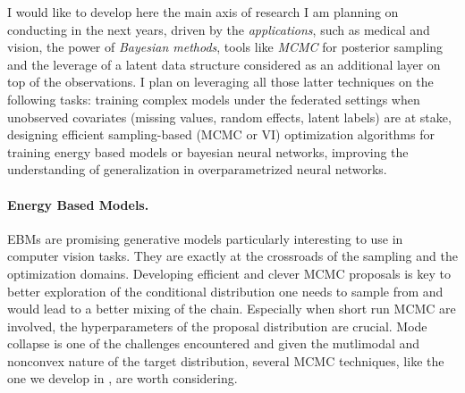 \documentclass[twoside,11pt]{article}
\begin{document}
\vspace{0.25in}
\textbf{} 
\vspace{0.15in}

I would like to develop here the main axis of research I am planning on conducting in the next years, driven by the \emph{applications}, such as medical and vision, the power of \emph{Bayesian methods}, tools like \emph{MCMC} for posterior sampling and the leverage of a latent data structure considered as an additional layer on top of the observations. 
I plan on leveraging all those latter techniques on the following tasks: training complex models under the federated settings when unobserved covariates (missing values, random effects, latent labels) are at stake, designing efficient sampling-based (MCMC or VI) optimization algorithms for training energy based models or bayesian neural networks, improving the understanding of generalization in overparametrized neural networks.

\vspace{0.08in}
\paragraph{Energy Based Models.} 
EBMs are promising generative models particularly interesting to use in computer vision tasks.
They are exactly at the crossroads of the sampling and the optimization domains.
Developing efficient and clever MCMC proposals is key to better exploration of the conditional distribution one needs to sample from and would lead to a better mixing of the chain. Especially when short run MCMC are involved, the hyperparameters of the proposal distribution are crucial.
Mode collapse is one of the challenges encountered and given the mutlimodal and nonconvex nature of the target distribution, several MCMC techniques, like the one we develop in \citep{karimi2020anila}, are worth considering.


\vspace{0.08in}
\end{document}
